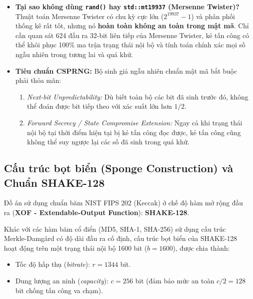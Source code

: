 \documentclass[12pt,a4paper]{article}
\theoremstyle{plain}
\begin{document}
\begin{itemize}
    \item \textbf{Tại sao không dùng \texttt{rand()} hay \texttt{std::mt19937} (Mersenne Twister)?}
    Thuật toán Mersenne Twister có chu kỳ cực lớn ($2^{19937}-1$) và phân phối thống kê rất tốt, nhưng nó \textbf{hoàn toàn không an toàn trong mật mã}. Chỉ cần quan sát 624 đầu ra 32-bit liên tiếp của Mersenne Twister, kẻ tấn công có thể khôi phục 100\% ma trận trạng thái nội bộ và tính toán chính xác mọi số ngẫu nhiên trong tương lai và quá khứ.
    \item \textbf{Tiêu chuẩn CSPRNG:} Bộ sinh giả ngẫu nhiên chuẩn mật mã bắt buộc phải thỏa mãn:
    \begin{enumerate}
        \item \textit{Next-bit Unpredictability:} Dù biết toàn bộ các bit đã sinh trước đó, không thể đoán được bit tiếp theo với xác suất lớn hơn $1/2$.
        \item \textit{Forward Secrecy / State Compromise Extension:} Ngay cả khi trạng thái nội bộ tại thời điểm hiện tại bị kẻ tấn công đọc được, kẻ tấn công cũng không thể suy ngược lại các số đã sinh trong quá khứ.
    \end{enumerate}
\end{itemize}

\subsection{Cấu trúc bọt biển (Sponge Construction) và Chuẩn SHAKE-128}
Đồ án sử dụng chuẩn băm NIST FIPS 202 (Keccak) ở chế độ hàm mở rộng đầu ra (\textbf{XOF - Extendable-Output Function}): \textbf{SHAKE-128}.

Khác với các hàm băm cổ điển (MD5, SHA-1, SHA-256) sử dụng cấu trúc Merkle-Damgård có độ dài đầu ra cố định, cấu trúc bọt biển của SHAKE-128 hoạt động trên một trạng thái nội bộ 1600 bit ($b = 1600$), được chia thành:
\begin{itemize}
    \item Tốc độ hấp thụ (\textit{bitrate}): $r = 1344$ bit.
    \item Dung lượng an ninh (\textit{capacity}): $c = 256$ bit (đảm bảo mức an toàn $c/2 = 128$ bit chống tấn công va chạm).
\end{itemize}
\end{document}

